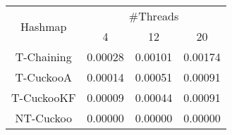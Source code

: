 \begin{tabular}{|c|c|c|c|}
\hline
\multirow{2}{*}{Hashmap} & \multicolumn{3}{c|}{\#Threads}\\\cline{2-4}& 4 & 12 & 20\\
\hline
\hline
T-Chaining & 0.00028 & 0.00101 & 0.00174\\
T-CuckooA & 0.00014 & 0.00051 & 0.00091\\
T-CuckooKF & 0.00009 & 0.00044 & 0.00091\\
NT-Cuckoo & 0.00000 & 0.00000 & 0.00000\\
\hline
\end{tabular}
